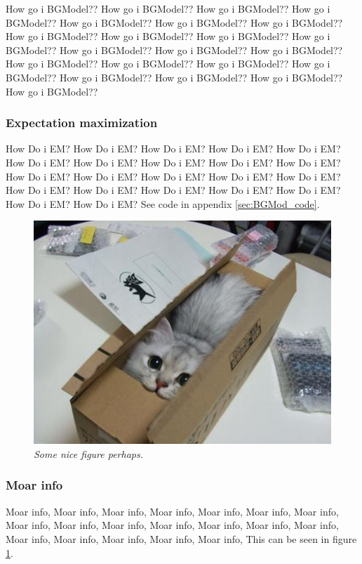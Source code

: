 How go i BGModel?? How go i BGModel?? How go i BGModel?? How go i BGModel?? How go i BGModel?? How go i BGModel?? How go i BGModel?? How go i BGModel?? How go i BGModel?? How go i BGModel?? How go i BGModel?? How go i BGModel?? How go i BGModel?? How go i BGModel?? How go i BGModel?? How go i BGModel?? How go i BGModel?? How go i BGModel?? How go i BGModel?? How go i BGModel?? How go i BGModel?? How go i BGModel??

\subsubsection{Expectation maximization}
How Do i EM? How Do i EM? How Do i EM? How Do i EM? How Do i EM? How Do i EM? How Do i EM? How Do i EM? How Do i EM? How Do i EM? How Do i EM? How Do i EM? How Do i EM? How Do i EM? How Do i EM? How Do i EM? How Do i EM? How Do i EM? How Do i EM? How Do i EM? How Do i EM? How Do i EM? 
See code in appendix \ref{sec:BGMod_code}. %

\begin{figure}[htb]
	\centering
	\includegraphics[width=\linewidth]{images/acatisfinetoo}
	\caption{\textit{Some nice figure perhaps.}}
	\label{fig:BGModeling_fig} %
\end{figure}

\subsubsection{Moar info}
Moar info, Moar info, Moar info, Moar info, Moar info, Moar info, Moar info, Moar info, Moar info, Moar info, Moar info, Moar info, Moar info, Moar info, Moar info, Moar info, Moar info, Moar info, Moar info, 
This can be seen in figure \ref{fig:BGModeling_fig}. %
